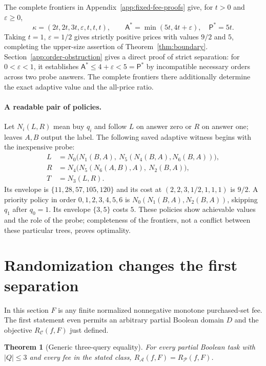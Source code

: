 \documentclass[pdflatex,sn-mathphys-num]{sn-jnl}
\newcommand{\A}{\mathsf{A}}
\newcommand{\Pcost}{\mathsf{P}}
\theoremstyle{thmstyleone}
\newtheorem{theorem}{Theorem}
\theoremstyle{thmstylethree}
\theoremstyle{thmstyletwo}
\begin{document}
The complete frontiers in Appendix~\ref{app:fixed-fee-proofs} give, for $t>0$ and $\varepsilon\geq0$,
\[
 \kappa=(2t,2t,3t,\varepsilon,t,t,t),\qquad
 \A^*=\min(5t,4t+\varepsilon),\quad\Pcost^*=5t.
\]
Taking $t=1$, $\varepsilon=1/2$ gives strictly positive prices with values $9/2$ and $5$, completing the upper-size assertion of Theorem~\ref{thm:boundary}. Section~\ref{app:order-obstruction} gives a direct proof of strict separation: for $0<\varepsilon<1$, it establishes $\A^*\leq4+\varepsilon<5=\Pcost^*$ by incompatible necessary orders across two probe answers. The complete frontiers there additionally determine the exact adaptive value and the all-price ratio.

\paragraph*{A readable pair of policies.}
Let $N_i(L,R)$ mean buy $q_i$ and follow $L$ on answer zero or $R$ on answer one; leaves $A,B$ output the label. The following saved adaptive witness begins with the inexpensive probe:
\begin{align*}
 L&=N_0\bigl(N_1(B,A),\ N_5(N_4(B,A),N_6(B,A))\bigr),\\
 R&=N_4\bigl(N_5(N_6(A,B),A),\ N_2(B,A)\bigr),\\
 T&=N_3(L,R).
\end{align*}
Its envelope is $\{11,28,57,105,120\}$ and its cost at $(2,2,3,1/2,1,1,1)$ is $9/2$. A priority policy in order $0,1,2,3,4,5,6$ is $N_0(N_1(B,A),N_2(B,A))$, skipping $q_1$ after $q_0=1$. Its envelope $\{3,5\}$ costs $5$. These policies show achievable values and the role of the probe; completeness of the frontiers, not a conflict between these particular trees, proves optimality.

\section{Randomization changes the first separation}
\label{sec:randomized-core}
In this section $F$ is any finite normalized nonnegative monotone
purchased-set fee. The first statement even permits an arbitrary partial
Boolean domain $D$ and the objective $R_{\mathcal C}(f,F)$ just defined.

\begin{theorem}[Generic three-query equality]
\label{thm:generic-random-three}
For every partial Boolean task with $|Q|\leq3$ and every fee in the
stated class, $R_{\mathcal A}(f,F)=R_{\mathcal P}(f,F)$.
\end{theorem}
\end{document}
